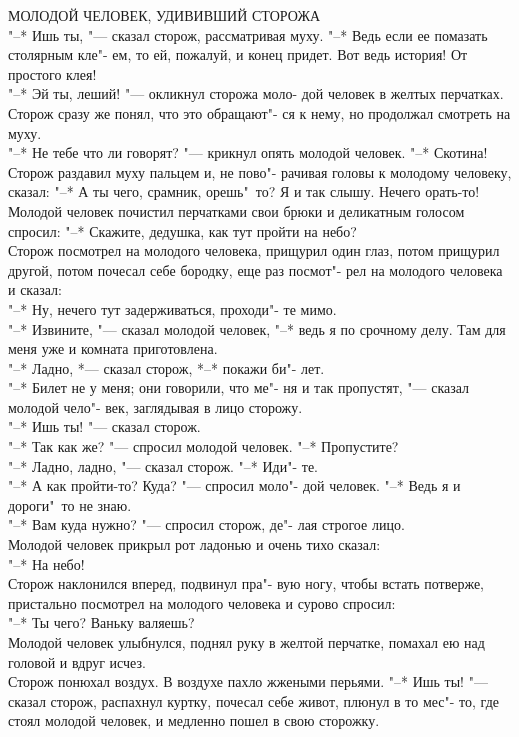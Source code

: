 МОЛОДОЙ  ЧЕЛОВЕК, УДИВИВШИЙ СТОРОЖА \\
    "--* Ишь ты, "--- сказал сторож,  рассматривая 
муху. "--* Ведь если ее помазать столярным кле"-
ем, то ей, пожалуй, и конец придет. Вот ведь
история! От простого клея! \\
    "--* Эй ты, леший! "--- окликнул сторожа моло-
дой человек в желтых перчатках.
    Сторож сразу же понял, что это обращают"-
ся к нему, но продолжал смотреть на
муху. \\
    "--* Не  тебе что  ли  говорят?  "---  крикнул
опять молодой человек. "--* Скотина! \\
    Сторож раздавил муху пальцем и, не пово"-
рачивая головы к молодому человеку, сказал:
    "--* А ты чего, срамник, орешь"~то?  Я и так
слышу. Нечего орать-то! \\
    Молодой человек почистил перчатками свои
брюки и деликатным голосом спросил:
    "--* Скажите,  дедушка,  как  тут пройти на
небо? \\
    Сторож  посмотрел  на молодого человека,
прищурил один глаз,  потом  прищурил другой,
потом почесал  себе бородку, еще раз посмот"-
рел на молодого человека и сказал: \\
    "--* Ну, нечего тут задерживаться, проходи"-
те мимо. \\
    "--* Извините, "---  сказал молодой человек, "--*
ведь я по срочному делу. Там для меня  уже и
комната приготовлена. \\
    "--* Ладно,  *---  сказал сторож, *--* покажи би"-
лет. \\
    "--* Билет не у меня; они говорили, что ме"-
ня и так пропустят, "--- сказал  молодой  чело"-
век, заглядывая в лицо сторожу. \\
    "--* Ишь ты! "--- сказал сторож. \\
    "--* Так как же? "--- спросил молодой человек.
"--* Пропустите? \\
    "--* Ладно, ладно, "--- сказал сторож. "--*  Иди"-
те. \\
    "--* А как пройти-то? Куда? "--- спросил моло"-
дой человек. "--* Ведь я и дороги"~то не знаю. \\
    "--* Вам куда нужно? "--- спросил сторож,  де"-
лая строгое лицо. \\
    Молодой  человек  прикрыл  рот ладонью и
очень тихо сказал: \\
    "--* На небо! \\
    Сторож наклонился вперед, подвинул  пра"-
вую ногу, чтобы  встать потверже, пристально
посмотрел  на  молодого  человека  и  сурово
спросил: \\
    "--* Ты чего? Ваньку валяешь? \\
    Молодой человек улыбнулся, поднял руку в
желтой  перчатке,  помахал  ею над головой и
вдруг исчез. \\
    Сторож понюхал воздух.  В  воздухе пахло
жжеными перьями.
    "--* Ишь  ты!  "---  сказал  сторож, распахнул
куртку, почесал себе живот, плюнул в то мес"-
то,  где стоял молодой  человек,  и медленно
пошел в свою сторожку.